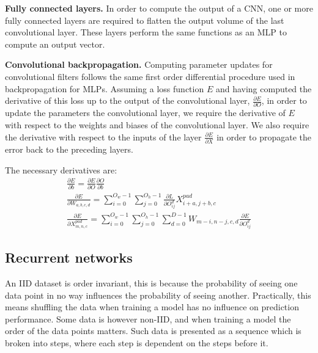 \noindent \textbf{Fully connected layers.} In order to compute the output of a CNN, one or more fully connected layers are required to flatten the output volume of the last convolutional layer. These layers perform the same functions as an MLP to compute an output vector. \par

\noindent \textbf{Convolutional backpropagation.} Computing parameter updates for convolutional filters follows the same first order differential procedure used in backpropagation for MLPs. Assuming a loss function $ E $ and having computed the derivative of this loss up to the output of the convolutional layer, $ \frac{\partial E} {\partial O} $, in order to update the parameters the convolutional layer, we require the derivative of $ E $ with respect to the weights and biases of the convolutional layer. We also require the derivative with respect to the inputs of the layer $\frac{\partial E} {\partial X}$ in order to propagate the error back to the preceding layers. \par

\noindent The necessary derivatives are:
\unskip
\begin{subequations}
	\begin{gather}
		\frac{\partial E} {\partial b} = \frac{\partial E} {\partial O}\frac{\partial O} {\partial b} \\
		\frac{\partial E} {\partial W_{a,b,c,d}} = \sum_{i=0}^{O_w - 1}\sum_{j=0}^{O_h - 1}\frac{\partial L} {\partial O_{ij}^{d}}X_{i+a,j+b,c}^{pad} \\
		\frac{\partial E} {\partial X_{m,n,c}^{pad}} = \sum_{i=0}^{O_w - 1}\sum_{j=0}^{O_h - 1}\sum_{d=0}^{D - 1}W_{m-i,n-j,c,d}\frac{\partial E} {\partial O_{ij}^{d}}
	\end{gather}
\end{subequations}


\subsection{Recurrent networks}

An IID dataset is order invariant, this is because the probability of seeing one data point in no way influences the probability of seeing another. Practically, this means shuffling the data when training a model has no influence on prediction performance. Some data is however non-IID, and when training a model the order of the data points matters. Such data is presented as a sequence which is broken into steps, where each step is dependent on the steps before it. \par

